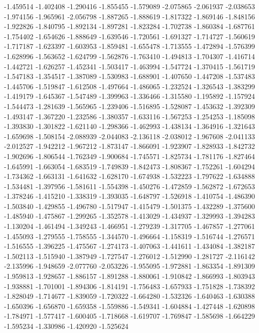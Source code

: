 -1.459514
-1.402408
-1.290416
-1.855455
-1.579089
-2.075865
-2.061937
-2.038653
-1.974156
-1.965961
-2.056798
-1.887265
-1.888619
-1.817322
-1.869146
-1.848156
-1.922826
-1.840795
-1.892134
-1.897281
-1.823284
-1.702738
-1.860384
-1.687761
-1.754402
-1.654626
-1.888649
-1.639546
-1.720561
-1.691327
-1.714727
-1.560619
-1.717187
-1.623397
-1.603953
-1.859481
-1.655478
-1.713555
-1.472894
-1.576399
-1.628996
-1.563652
-1.624799
-1.562876
-1.763410
-1.494813
-1.704307
-1.416714
-1.442721
-1.626257
-1.452341
-1.503417
-1.463994
-1.547724
-1.370415
-1.561719
-1.547183
-1.354517
-1.387089
-1.530983
-1.688901
-1.407650
-1.447208
-1.537483
-1.445706
-1.519847
-1.612508
-1.497664
-1.486065
-1.232524
-1.326543
-1.383299
-1.419179
-1.645367
-1.547489
-1.399963
-1.336466
-1.315580
-1.195892
-1.157924
-1.544473
-1.281639
-1.565965
-1.239406
-1.516895
-1.528087
-1.453632
-1.392309
-1.493147
-1.367220
-1.232586
-1.380357
-1.633116
-1.567253
-1.254253
-1.185098
-1.393830
-1.301822
-1.621140
-1.298366
-1.462993
-1.438134
-1.364916
-1.321643
-1.659698
-1.508154
-2.088939
-2.044083
-2.136118
-2.038012
-1.967608
-2.041133
-2.012527
-1.942212
-1.967212
-1.873147
-1.866091
-1.923907
-1.828933
-1.842732
-1.902696
-1.806544
-1.762349
-1.900684
-1.745571
-1.825734
-1.781176
-1.827464
-1.645991
-1.663054
-1.683519
-1.749839
-1.842473
-1.808367
-1.752261
-1.604294
-1.734362
-1.663131
-1.641632
-1.628170
-1.674938
-1.532223
-1.797622
-1.634888
-1.534481
-1.397956
-1.581611
-1.554398
-1.450276
-1.472859
-1.562872
-1.672653
-1.378246
-1.415210
-1.338319
-1.393035
-1.648797
-1.526918
-1.410754
-1.486390
-1.503840
-1.429855
-1.496780
-1.517947
-1.415479
-1.501375
-1.432289
-1.375600
-1.485940
-1.475867
-1.299265
-1.352578
-1.413029
-1.434937
-1.329993
-1.394283
-1.130204
-1.461494
-1.349243
-1.466951
-1.279239
-1.317705
-1.467857
-1.277061
-1.455093
-1.279555
-1.758555
-1.344570
-1.496664
-1.158319
-1.516744
-1.276571
-1.516555
-1.396225
-1.475567
-1.274173
-1.407063
-1.441611
-1.434084
-1.382187
-1.502113
-1.515940
-1.387949
-1.727547
-1.276012
-1.512990
-1.281727
-2.116142
-2.135996
-1.948659
-2.077760
-2.053226
-1.955095
-1.972881
-1.863354
-1.891309
-1.959813
-1.928657
-1.886157
-1.891288
-1.880061
-1.910842
-1.866993
-1.803943
-1.938881
-1.701001
-1.894306
-1.814191
-1.756483
-1.657933
-1.751828
-1.738392
-1.828049
-1.714677
-1.839059
-1.720322
-1.664280
-1.532326
-1.640463
-1.630388
-1.650396
-1.656870
-1.659358
-1.559886
-1.549341
-1.604884
-1.427448
-1.620898
-1.784971
-1.577417
-1.600405
-1.718668
-1.619707
-1.769847
-1.585698
-1.664229
-1.595234
-1.330986
-1.420920
-1.525624
